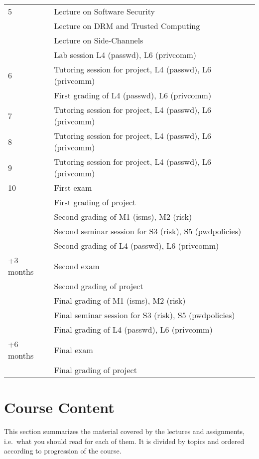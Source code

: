\documentclass[a4paper]{llncs}
\begin{document}
\begin{table}
\begin{tabular}{lp{9cm}}
    \midrule
    5
      & Lecture on Software Security\\
      & Lecture on DRM and Trusted Computing\\
      & Lecture on Side-Channels\\
      & Lab session L4 (passwd), L6 (privcomm)\\
    \midrule
    6
      & Tutoring session for project, L4 (passwd), L6 (privcomm)\\
      & First grading of L4 (passwd), L6 (privcomm)\\
    \midrule
    7
      & Tutoring session for project, L4 (passwd), L6 (privcomm)\\
    \midrule
    8
      & Tutoring session for project, L4 (passwd), L6 (privcomm)\\
    \midrule
    9
      & Tutoring session for project, L4 (passwd), L6 (privcomm)\\
    \midrule
    10
      & First exam\\
      & First grading of project\\
      & Second grading of M1 (isms), M2 (risk)\\
      & Second seminar session for S3 (risk), S5 (pwdpolicies)\\
      & Second grading of L4 (passwd), L6 (privcomm)\\
    \midrule
    +3 months
      & Second exam\\
      & Second grading of project\\
      & Final grading of M1 (isms), M2 (risk)\\
      & Final seminar session for S3 (risk), S5 (pwdpolicies)\\
      & Final grading of L4 (passwd), L6 (privcomm)\\
    \midrule
    +6 months
      & Final exam\\
      & Final grading of project\\
    \bottomrule
  \end{tabular}
\end{table}


\section{Course Content}

This section summarizes the material covered by the lectures and assignments, 
i.e.~what you should read for each of them.
It is divided by topics and ordered according to progression of the course.
\end{document}
